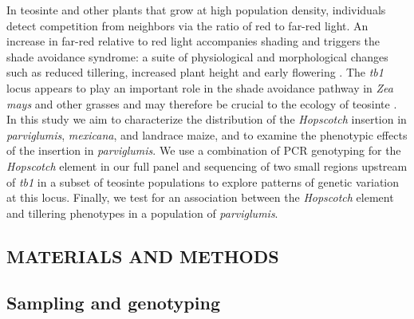 \documentclass[11pt]{article}
\begin{document}
\begin{linenumbers}
\begin{flushleft}
In teosinte and other plants that grow at high population density, individuals detect competition from neighbors via the ratio of red to far-red light.  An increase in far-red relative to red light accompanies shading and triggers the shade avoidance syndrome: a suite of physiological and morphological changes such as reduced tillering, increased plant height and early flowering \citep{KebromBrutnell2007}. The \emph{tb1} locus appears to play an important role in the shade avoidance pathway in \emph{Zea mays} and other grasses and may therefore be crucial to the ecology of teosinte \citep{KebromBrutnell2007, LukensDoebley1999}.  In this study we aim to characterize the distribution of the \emph{Hopscotch} insertion in \emph{parviglumis}, \emph{mexicana}, and landrace maize, and to examine the phenotypic effects of the insertion in \emph{parviglumis}. We use a combination of PCR genotyping for the \emph{Hopscotch} element in our full panel and sequencing of two small regions upstream of \emph{tb1} in a subset of teosinte populations to explore patterns of genetic variation at this locus. Finally, we test for an association between the \emph{Hopscotch} element and tillering phenotypes in a population of \emph{parviglumis}.

\begin{centering}
\section*{MATERIALS AND METHODS}
\end{centering}

\subsection*{Sampling and genotyping}


\end{flushleft}
\end{linenumbers}
\end{document}
